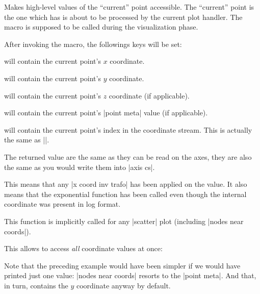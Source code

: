 \begin{command}{\pgfplotspointgetcoordinates}
    Makes high-level values of the ``current'' point accessible. The ``current''
    point is the one which has is about to be processed by the current plot
    handler. The macro is supposed to be called during the visualization phase.

    After invoking the macro, the followings keys will be set:

     will contain the current point's $x$ coordinate.

     will contain the current point's $y$ coordinate.

     will contain the current point's $z$ coordinate
    (if applicable).

     will contain the current point's
    |point meta| value (if applicable).

     will contain the current point's index in
    the coordinate stream. This is actually the same as |\coordindex|.

    The returned value are the same as they can be read on the axes, they are
    also the same as you would write them into |axis cs|.

    This means that any |x coord inv trafo| has been applied on the value. It
    also means that the exponential function has been called even though the
    internal coordinate was present in log format.

    This function is implicitly called for any |scatter| plot (including
    |nodes near coords|).

    This allows to access \emph{all} coordinate values at once:
\begin{codeexample}[]
\end{codeexample}
    Note that the preceding example would have been simpler if we would have
    printed just one value: |nodes near coords| resorts to the |point meta|.
    And that, in turn, contains the $y$ coordinate anyway by default.


\end{command}
